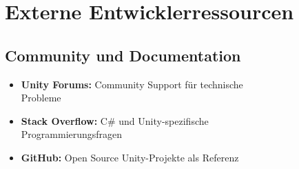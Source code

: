 \section{Externe Entwicklerressourcen}

\subsection{Community und Documentation}
\begin{itemize}
    \item \textbf{Unity Forums:} Community Support für technische \\
          Probleme
    \item \textbf{Stack Overflow:} C\# und Unity-spezifische \\
          Programmierungsfragen
    \item \textbf{GitHub:} Open Source Unity-Projekte als Referenz
\end{itemize}

